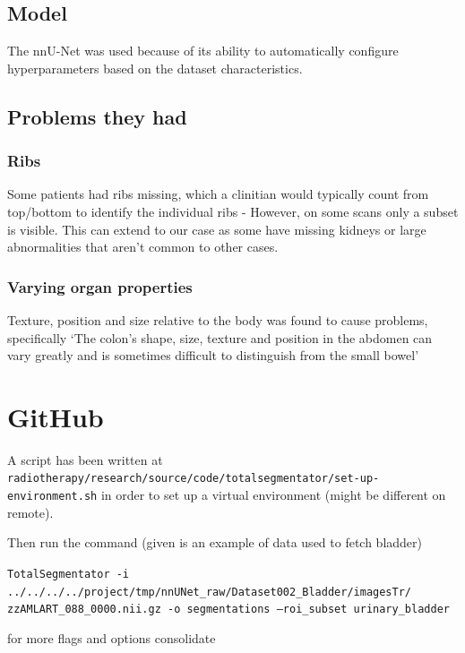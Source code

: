 \documentclass[11pt]{article}
\begin{document}
\subsection{Model}

The nnU-Net was used because of its ability to automatically configure hyperparameters based on the dataset characteristics.

\subsection{Problems they had}

\subsubsection{Ribs}

Some patients had ribs missing, which a clinitian would typically count from top/bottom to identify the individual ribs - However, on some scans only a subset is visible. This can extend to our case as some have missing kidneys or large abnormalities that aren't common to other cases.

\subsubsection{Varying organ properties}

Texture, position and size relative to the body was found to cause problems, specifically `The colon's shape, size, texture and position in the abdomen can vary greatly and is sometimes difficult to distinguish from the small bowel'

\section{GitHub}

A script has been written at \texttt{radiotherapy/research/source/code/totalsegmentator/set-up-environment.sh} in order to set up a virtual environment (might be different on remote). 

Then run the command (given is an example of data used to fetch bladder)

\texttt{TotalSegmentator -i ../../../../project/tmp/nnUNet\_raw/Dataset002\_Bladder/imagesTr/ zzAMLART\_088\_0000.nii.gz -o segmentations --roi\_subset urinary\_bladder}

for more flags and options consolidate \cite{totalsegmentor-git}



\printbibliography
\end{document}
